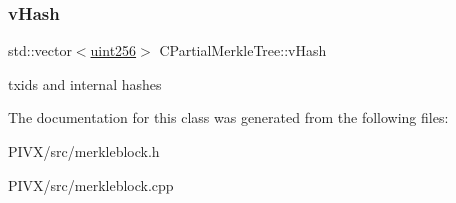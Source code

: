 \subsubsection{\texorpdfstring{v\+Hash}{vHash}}
{\footnotesize\ttfamily std\+::vector$<$\mbox{\hyperlink{classuint256}{uint256}}$>$ C\+Partial\+Merkle\+Tree\+::v\+Hash\hspace{0.3cm}{\ttfamily [protected]}}

txids and internal hashes 

The documentation for this class was generated from the following files\+:\begin{DoxyCompactItemize}
\item 
P\+I\+V\+X/src/merkleblock.\+h\item 
P\+I\+V\+X/src/merkleblock.\+cpp\end{DoxyCompactItemize}
